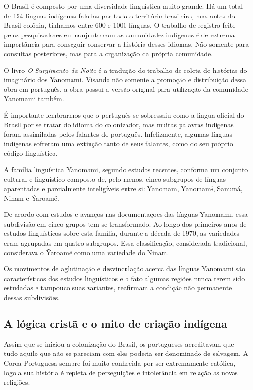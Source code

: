\documentclass[12pt]{extarticle}
\begin{document}
O Brasil é composto por uma diversidade linguística muito grande. Há um
total de 154 línguas indígenas faladas por todo o território brasileiro,
mas antes do Brasil colônia, tínhamos entre 600 e 1000 línguas. O
trabalho de registro feito pelos pesquisadores em conjunto com as
comunidades indígenas é de extrema importância para conseguir conservar
a história desses idiomas. Não somente para consultas posteriores, mas
para a organização da própria comunidade.

O livro \emph{O Surgimento da Noite} é a tradução do trabalho de coleta
de histórias do imaginário dos Yanomami. Visando não somente a promoção
e distribuição dessa obra em português, a obra possui a versão original
para utilização da comunidade Yanomami também.


É importante lembrarmos que o português se sobressaiu como a língua
oficial do Brasil por se tratar do idioma do colonizador, mas muitas
palavras indígenas foram assimiladas pelos falantes do português.
Infelizmente, algumas línguas indígenas sofreram uma extinção tanto de
seus falantes, como do seu próprio código linguístico.

A família linguística Yanomami, segundo estudos recentes, conforma um 
conjunto cultural e linguístico composto de, pelo menos, cinco subgrupos 
de línguas aparentadas e parcialmente inteligíveis entre si: Yanomam, 
Yanomamɨ, Sanumá, Ninam e Ỹaroamë. 

De acordo com estudos e avanços nas documentações das línguas Yanomami, essa
subdivisão em cinco grupos tem se transformado. Ao longo dos primeiros anos 
de estudos linguísticos sobre esta família, durante a década de 1970, as variedades 
eram agrupadas em quatro subgrupos. Essa classificação, considerada tradicional,
considerava o Ỹaroamë como uma variedade do Ninam. 

Os movimentos de aglutinação e desvinculação acerca das línguas Yanomami são 
característicos dos estudos linguísticos e o fato algumas regiões nunca terem 
sido estudadas e tampouco suas variantes, reafirmam a condição não permanente 
dessas subdivisões. 

\subsection{A lógica cristã e o mito de criação indígena}

Assim que se iniciou a colonização do Brasil, os portugueses acreditavam
que tudo aquilo que não se pareciam com eles poderia ser denominado de
selvagem. A Coroa Portuguesa sempre foi muito conhecida por ser
extremamente católica, logo a sua história é repleta de perseguições e
intolerância em relação as novas religiões.
\end{document}
